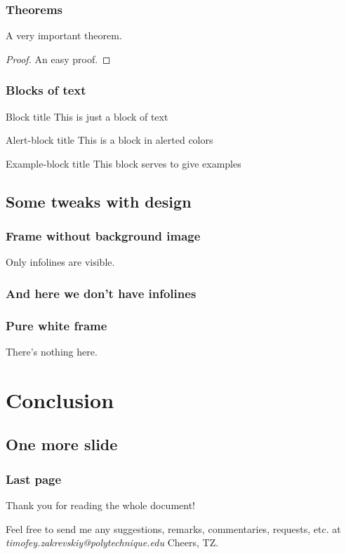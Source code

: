 \documentclass{beamer}
\begin{document}
\begin{frame}
\frametitle{Theorems}
\begin{theorem}
A very important theorem.
\end{theorem}
\begin{proof}
An easy proof.
\end{proof}
\end{frame}


\begin{frame}
\frametitle{Blocks of text}
\begin{block}{Block title}
This is just a block of text
\end{block}

\begin{alertblock}{Alert-block title}
This is a block in alerted colors
\end{alertblock}

\begin{exampleblock}{Example-block title}
This block serves to give examples
\end{exampleblock}
\end{frame}

\subsection{Some tweaks with design}
{ %
\begin{frame}
\frametitle{Frame without background image}


Only infolines are visible.
\end{frame}
}

{%
\begin{frame}
\frametitle{And here we don't have infolines}
\end{frame}
}

{%
\begin{frame}
\frametitle{Pure white frame}

There's nothing here.

\end{frame}
}

\section{Conclusion}
\subsection{One more slide}
\begin{frame}
\frametitle{Last page}
Thank you for reading the whole document!

Feel free to send me any suggestions, remarks, commentaries, requests, etc. at \textit{{\color{Xblue}timofey.zakrevskiy@polytechnique.edu}}
\vfill
Cheers, TZ.
\end{frame}
\end{document}
